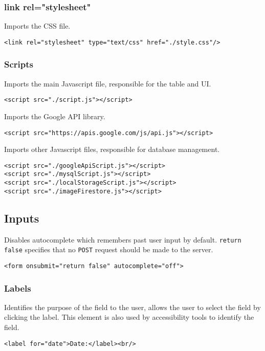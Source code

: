 \documentclass[letterpaper]{article}
\begin{document}
\subsubsection{link rel="stylesheet"}

Imports the CSS file.
\begin{lstlisting}[firstnumber=5]
<link rel="stylesheet" type="text/css" href="./style.css"/>
\end{lstlisting}

\subsubsection{Scripts}

Imports the main Javascript file, responsible for the table and UI.
\begin{lstlisting}[firstnumber=7]
<script src="./script.js"></script>
\end{lstlisting}

Imports the Google API library.
\begin{lstlisting}[firstnumber=8]
<script src="https://apis.google.com/js/api.js"></script>
\end{lstlisting}

Imports other Javascript files, responsible for database management.
\begin{lstlisting}[firstnumber=9]
<script src="./googleApiScript.js"></script>
<script src="./mysqlScript.js"></script>
<script src="./localStorageScript.js"></script>
<script src="./imageFirestore.js"></script>
\end{lstlisting}

\subsection{Inputs}

Disables autocomplete which remembers past user input by default. \lstinline{return false} specifies that no \lstinline{POST} request should be made to the server.
\begin{lstlisting}[firstnumber=20]
<form onsubmit="return false" autocomplete="off">
\end{lstlisting}

\subsubsection{Labels}

Identifies the purpose of the field to the user, allows the user to select the field by clicking the label.
This element is also used by accessibility tools to identify the field.
\begin{lstlisting}[firstnumber=22]
<label for="date">Date:</label><br/>
\end{lstlisting}
\end{document}
